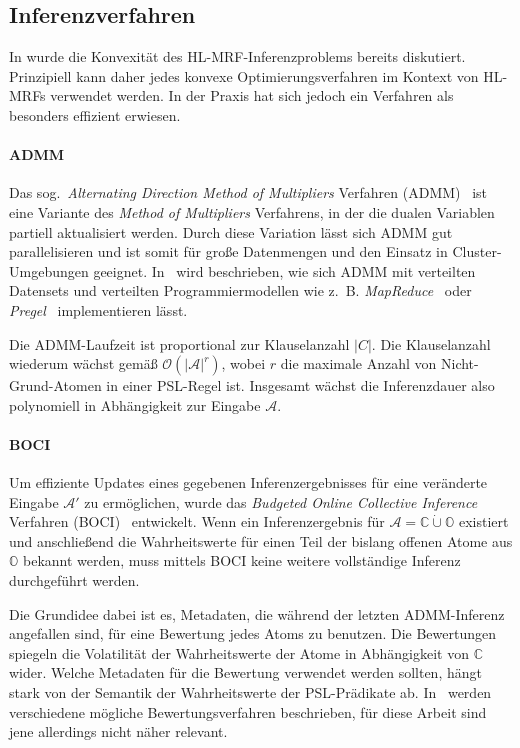 \subsection{Inferenzverfahren}%
\label{sec:theory:psl:inference}

In  wurde die Konvexität des HL-MRF-Inferenzproblems bereits diskutiert.
Prinzipiell kann daher jedes konvexe Optimierungsverfahren im Kontext von HL-MRFs verwendet werden.
In der Praxis hat sich jedoch ein Verfahren als besonders effizient erwiesen.

\paragraph{ADMM}
Das sog.\ \textit{Alternating Direction Method of Multipliers} Verfahren (ADMM)~\cite{Boyd2011} ist eine Variante des \textit{Method of Multipliers} Verfahrens, in der die dualen Variablen partiell aktualisiert werden.
Durch diese Variation lässt sich ADMM gut parallelisieren und ist somit für große Datenmengen und den Einsatz in Cluster-Umgebungen geeignet.
In~\cite[Kapitel 10]{Boyd2011} wird beschrieben, wie sich ADMM mit verteilten Datensets und verteilten Programmiermodellen wie z.~B. \textit{MapReduce}~\cite{Dean2008} oder \textit{Pregel}~\cite{Malewicz2010} implementieren lässt.

Die ADMM-Laufzeit ist proportional zur Klauselanzahl $|C|$.
Die Klauselanzahl wiederum wächst gemäß $\mathcal{O}(|\mathcal{A}|^r)$, wobei $r$ die maximale Anzahl von Nicht-Grund-Atomen in einer PSL-Regel ist.
Insgesamt wächst die Inferenzdauer also polynomiell in Abhängigkeit zur Eingabe $\mathcal{A}$.

\paragraph{BOCI}
Um effiziente Updates eines gegebenen Inferenzergebnisses für eine veränderte Eingabe $\mathcal{A'}$ zu ermöglichen, wurde das \textit{Budgeted Online Collective Inference} Verfahren (BOCI)~\cite{Pujara2015} entwickelt.
Wenn ein Inferenzergebnis für $\mathcal{A} = \mathbb{C} \mathbin{\dot\cup} \mathbb{O}$ existiert und anschließend die Wahrheitswerte für einen Teil der bislang offenen Atome aus $\mathbb{O}$ bekannt werden, muss mittels BOCI keine weitere vollständige Inferenz durchgeführt werden.

Die Grundidee dabei ist es, Metadaten, die während der letzten ADMM-Inferenz angefallen sind, für eine Bewertung jedes Atoms zu benutzen.
Die Bewertungen spiegeln die Volatilität der Wahrheitswerte der Atome in Abhängigkeit von $\mathbb{C}$ wider.
Welche Metadaten für die Bewertung verwendet werden sollten, hängt stark von der Semantik der Wahrheitswerte der PSL-Prädikate ab.
In~\cite[Kapitel 4]{Pujara2015} werden verschiedene mögliche Bewertungsverfahren beschrieben, für diese Arbeit sind jene allerdings nicht näher relevant.

